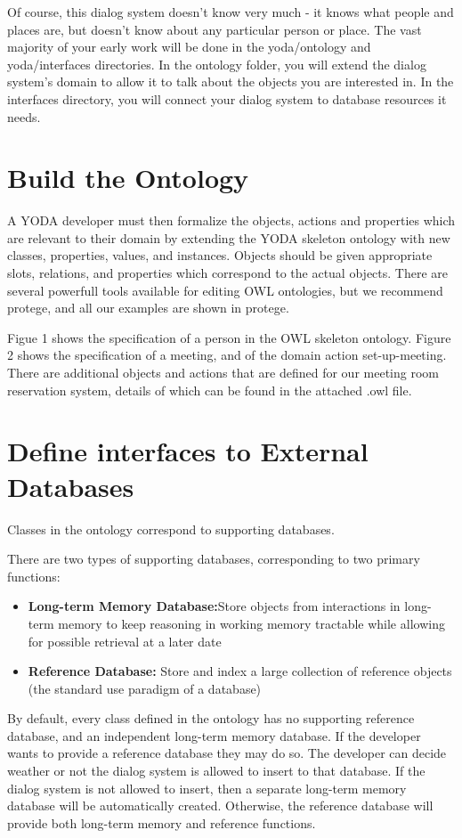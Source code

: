 \documentclass[10pt]{article}
\begin{document}
Of course, this dialog system doesn't know very much - it knows what people and places are, but doesn't know about any particular person or place.
The vast majority of your early work will be done in the yoda/ontology and yoda/interfaces directories.
In the ontology folder, you will extend the dialog system's domain to allow it to talk about the objects you are interested in.
In the interfaces directory, you will connect your dialog system to database resources it needs.

\section {Build the Ontology}

A YODA developer must then formalize the objects, actions and properties which are relevant to their domain by extending the YODA skeleton ontology with new classes, properties, values, and instances.
Objects should be given appropriate slots, relations, and properties which correspond to the actual objects.
There are several powerfull tools available for editing OWL ontologies, but we recommend protege, and all our examples are shown in protege.


Figue 1 shows the specification of a person in the OWL skeleton ontology.
Figure 2 shows the specification of a meeting, and of the domain action set-up-meeting.
There are additional objects and actions that are defined for our meeting room reservation system, details of which can be found in the attached .owl file.


\section {Define interfaces to External Databases}
Classes in the ontology correspond to supporting databases.

There are two types of supporting databases, corresponding to two primary functions:
\begin{itemize}
\item{\textbf{Long-term Memory Database:}Store objects from interactions in long-term memory to keep reasoning in working memory tractable while allowing for possible retrieval at a later date}
\item{\textbf{Reference Database:} Store and index a large collection of reference objects (the standard use paradigm of a database)}
\end{itemize}

By default, every class defined in the ontology has no supporting reference database, and an independent long-term memory database.
If the developer wants to provide a reference database they may do so.
The developer can decide weather or not the dialog system is allowed to insert to that database.
If the dialog system is not allowed to insert, then a separate long-term memory database will be automatically created.
Otherwise, the reference database will provide both long-term memory and reference functions.
\end{document}
